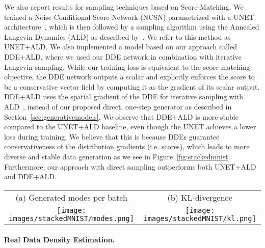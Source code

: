 \documentclass{article}
\begin{document}
We also report results for sampling techniques based on Score-Matching. We trained a Noise Conditional Score Network (NCSN) parametrized with a UNET architecture~\citep{ronneberger2015u}, which is then followed by a sampling algorithm using the Annealed Langevin Dynamics (ALD) as described by~\citet{Song2019GMG}. We refer to this method as UNET+ALD. We also implemented a model based on our approach called DDE+ALD, where we used our DDE network in combination with iterative Langevin sampling. While our training loss is equivalent to the score-matching objective, the DDE network outputs a scalar and explicitly enforces the score to be a conservative vector field by computing it as the gradient of its scalar output. DDE+ALD uses the spatial gradient of the DDE for iterative sampling with ALD~\citep{Song2019GMG}, instead of our proposed direct, one-step generator as described in Section~\ref{sec:generativemodels}. We observe that DDE+ALD is more stable compared to the UNET+ALD baseline, even though the UNET achieves a lower loss during training. We believe that this is because DDEs guarantee conservativeness of the distribution gradients (i.e. scores), which leads to more diverse and stable data generation as we see in Figure~\ref{fig:stackedmnist}. Furthermore, our approach with direct sampling outperforms both UNET+ALD and DDE+ALD.

\begin{figure*}[t]
\centering
\begin{tabular} {cc}
(a) Generated modes per batch & (b) KL-divergence\\
\texttt{[image: images/stackedMNIST/modes.png]} &
\texttt{[image: images/stackedMNIST/kl.png]} \end{tabular} 
\caption[Stacked-MNIST dataset results.]
{
Mode-collapse experiment results on Stacked-MNIST as a function of training iterations (for discriminator or DDE).
(a) Number of generated modes per batch of size 512.
(b) Reverse KL-divergence between the generated and the data distribution in the logarithmic domain.
}
\label{fig:stackedmnist}
\end{figure*}

\paragraph{Real Data Density Estimation.}
\end{document}

